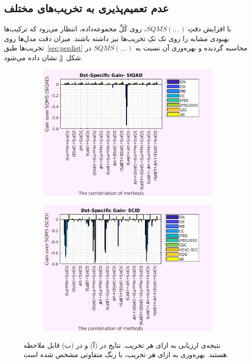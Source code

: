 \documentclass[twocolumn]{article}
\begin{document}
\subsection{عدم تعمیم‌پذیری به تخریب‌های مختلف} \label{sec:gen_dst}
با افزایش دقتِ $SQMS(., .)$، روی کُلِّ مجموعه‌داده، انتظار می‌رود که ترکیب‌ها بهبودی مشابه را روی تک تکِ تخریب‌ها نیز داشته باشند. میزان دقت مدل‌ها روی تخریب‌ها طبق~\ref{sec:perdist} محاسبه گردیده و بهره‌وری آن نسبت به $SQMS(.,.)$ در شکل~\ref{fig:res_per_distortion} نشان داده می‌شود.
\begin{figure}
	\begin{subfigure}{0.47\textwidth}
		\includegraphics[width=\textwidth]{per_distortion_SIQAD}
		\caption{}
		\label{fig:res_per_distortion_SIQAD}
	\end{subfigure} 
	\hfill
	\begin{subfigure}{0.47\textwidth}
		\includegraphics[width=\textwidth]{per_distortion_SCID}
		\caption{}
		\label{fig:res_per_distortion_SCID}
	\end{subfigure}
	\caption{نتیجه‌ی ارزیابی به ازای هر تخریب. نتایج  در (آ) و  در (ب) قابل ملاحظه هستند. بهره‌وری به ازای هر تخریب، با رنگ متفاوتی مشخص شده است.}
	\label{fig:res_per_distortion}
\end{figure}
\end{document}
